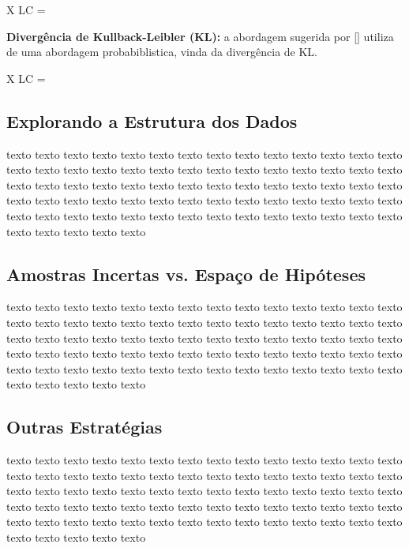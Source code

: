 X {LC} =  

\textbf{Divergência de Kullback-Leibler (KL):} a abordagem sugerida por [\cite{mccallumzy1998employing}] utiliza de uma abordagem probabiblistica, vinda da divergência de KL.

X {LC} =  


\subsection{Explorando a Estrutura dos Dados} 
\label{sec:explorando_estrutura_dados }

texto texto texto texto texto texto texto texto texto texto texto texto texto texto texto texto texto texto texto texto texto texto texto texto texto texto texto texto texto texto texto texto texto texto texto texto texto texto texto texto texto texto texto texto texto texto texto texto texto texto texto texto texto texto texto texto texto texto texto texto texto texto texto texto texto texto texto texto texto texto texto texto texto texto texto 


\subsection{Amostras Incertas vs. Espaço de Hipóteses} 
\label{sec:minimizing_expected}

texto texto texto texto texto texto texto texto texto texto texto texto texto texto texto texto texto texto texto texto texto texto texto texto texto texto texto texto texto texto texto texto texto texto texto texto texto texto texto texto texto texto texto texto texto texto texto texto texto texto texto texto texto texto texto texto texto texto texto texto texto texto texto texto texto texto texto texto texto texto texto texto texto texto texto 


\subsection{Outras Estratégias} 
\label{sec:minimizing_expected}

texto texto texto texto texto texto texto texto texto texto texto texto texto texto texto texto texto texto texto texto texto texto texto texto texto texto texto texto texto texto texto texto texto texto texto texto texto texto texto texto texto texto texto texto texto texto texto texto texto texto texto texto texto texto texto texto texto texto texto texto texto texto texto texto texto texto texto texto texto texto texto texto texto texto texto 





